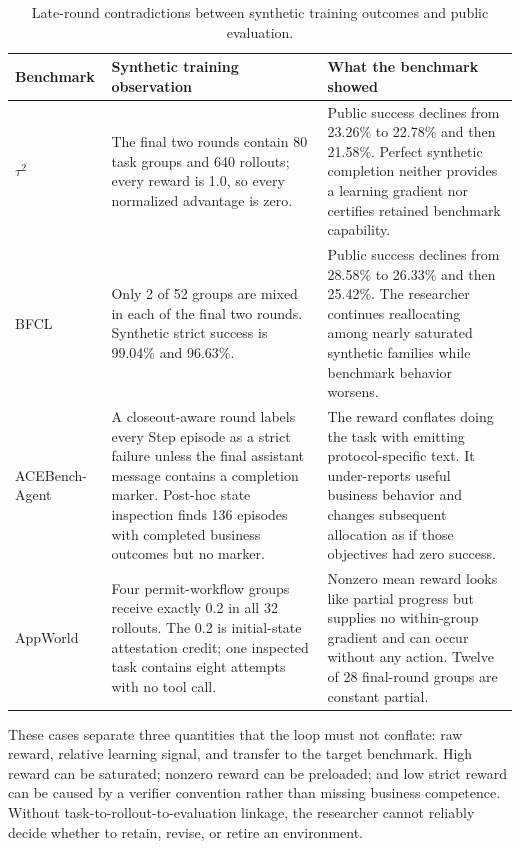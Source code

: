 \begin{table}[ht]
\color{blue}
\centering\small
\caption{Late-round contradictions between synthetic training outcomes and public evaluation.}
\label{tab:codex_signal_cases}
\begin{tabularx}{\linewidth}{@{}p{.14\linewidth}>{\raggedright\arraybackslash}X>{\raggedright\arraybackslash}X@{}}
\toprule
Benchmark & Synthetic training observation & What the benchmark showed \\
\midrule
$\tau^2$ & The final two rounds contain 80 task groups and 640 rollouts; every reward is 1.0, so every normalized advantage is zero. & Public success declines from 23.26\% to 22.78\% and then 21.58\%. Perfect synthetic completion neither provides a learning gradient nor certifies retained benchmark capability. \\
\addlinespace
BFCL & Only 2 of 52 groups are mixed in each of the final two rounds. Synthetic strict success is 99.04\% and 96.63\%. & Public success declines from 28.58\% to 26.33\% and then 25.42\%. The researcher continues reallocating among nearly saturated synthetic families while benchmark behavior worsens. \\
\addlinespace
ACEBench-Agent & A closeout-aware round labels every Step episode as a strict failure unless the final assistant message contains a completion marker. Post-hoc state inspection finds 136 episodes with completed business outcomes but no marker. & The reward conflates doing the task with emitting protocol-specific text. It under-reports useful business behavior and changes subsequent allocation as if those objectives had zero success. \\
\addlinespace
AppWorld & Four permit-workflow groups receive exactly 0.2 in all 32 rollouts. The 0.2 is initial-state attestation credit; one inspected task contains eight attempts with no tool call. & Nonzero mean reward looks like partial progress but supplies no within-group gradient and can occur without any action. Twelve of 28 final-round groups are constant partial. \\
\bottomrule
\end{tabularx}
\end{table}

These cases separate three quantities that the loop must not conflate: raw reward, relative learning signal, and transfer to the target benchmark. High reward can be saturated; nonzero reward can be preloaded; and low strict reward can be caused by a verifier convention rather than missing business competence. Without task-to-rollout-to-evaluation linkage, the researcher cannot reliably decide whether to retain, revise, or retire an environment.

